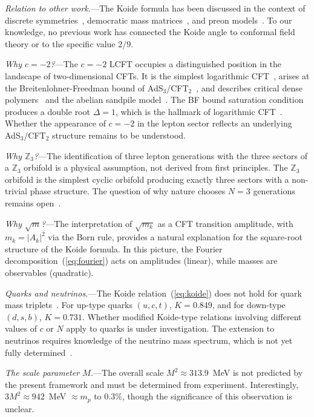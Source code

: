 \documentclass[aps,prl,twocolumn,superscriptaddress]{revtex4-2}
\begin{document}
\emph{Relation to other work.}---The Koide formula has been discussed in the context of
discrete symmetries~\cite{Foot1994,Ma2006}, democratic mass
matrices~\cite{Brannen2006}, and preon models~\cite{Koide1982}. To our knowledge, no
previous work has connected the Koide angle to conformal field theory or to the specific
value $2/9$.

\emph{Why $c = -2$?}---The $c = -2$ LCFT occupies a distinguished position in the
landscape of two-dimensional CFTs. It is the simplest logarithmic CFT~\cite{Gurarie1993},
arises at the Breitenlohner-Freedman bound of AdS$_3$/CFT$_2$~\cite{BF1982}, and describes
critical dense polymers~\cite{Saleur1992} and the abelian sandpile
model~\cite{Mahieu2001}. The BF bound saturation condition produces a double root
$\Delta = 1$, which is the hallmark of logarithmic CFT~\cite{Flohr2003}.
Whether the appearance of $c=-2$ in the lepton sector reflects an underlying
AdS$_3$/CFT$_2$ structure remains to be understood.

\emph{Why $\mathbb{Z}_3$?}---The identification of three lepton generations with the
three sectors of a $\mathbb{Z}_3$ orbifold is a physical assumption, not derived from
first principles. The $\mathbb{Z}_3$ orbifold is the simplest cyclic orbifold producing
exactly three sectors with a non-trivial phase structure. The question of why nature
chooses $N = 3$ generations remains open~\cite{Frampton1999}.

\emph{Why $\sqrt{m}$?}---The interpretation of $\sqrt{m_k}$ as a CFT transition amplitude,
with $m_k = |A_k|^2$ via the Born rule, provides a natural explanation for the
square-root structure of the Koide formula. In this picture, the Fourier
decomposition~(\ref{eq:fourier}) acts on amplitudes (linear), while masses are
observables (quadratic).

\emph{Quarks and neutrinos.}---The Koide relation~(\ref{eq:koide}) does not hold for
quark mass triplets~\cite{Rivero2005}. For up-type quarks $(u,c,t)$, $K = 0.849$, and
for down-type $(d,s,b)$, $K = 0.731$. Whether modified Koide-type relations involving
different values of $c$ or $N$ apply to quarks is under investigation. The extension to
neutrinos requires knowledge of the neutrino mass spectrum, which is not yet fully
determined~\cite{PDG2024}.

\emph{The scale parameter $M$.}---The overall scale $M^2 \approx 313.9$~MeV is not
predicted by the present framework and must be determined from experiment. Interestingly,
$3M^2 \approx 942$~MeV $\approx m_p$ to $0.3\%$, though the significance of this
observation is unclear.
\end{document}
